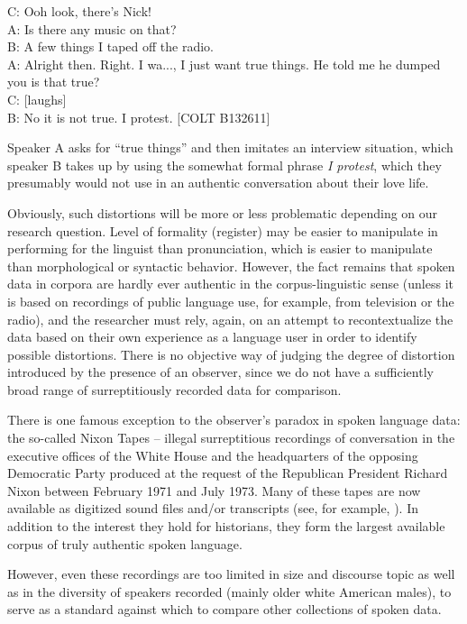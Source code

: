 \begin{exe}
\ex
\label{ex:truethings}
C: Ooh look, there's Nick! \\
A: Is there any music on that? \\
B: A few things I taped off the radio. \\
A: Alright then. Right. I wa..., I just want true things. He told me he dumped you is that true? \\
C: [laughs] \\
B: No it is not true. I protest. [COLT B132611] 
\end{exe}

Speaker A asks for ``true things'' and then imitates an interview situation, which speaker B takes up by using the somewhat formal phrase \textit{I protest}, which they presumably would not use in an authentic conversation about their love life.

Obviously, such distortions will be more or less problematic depending on our research question. Level of formality (register) may be easier to manipulate in performing for the linguist than pronunciation, which is easier to manipulate than morphological or syntactic behavior. However, the fact remains that spoken data in corpora are hardly ever authentic in the corpus-linguistic sense (unless it is based on recordings of public language use, for example, from television or the radio), and the researcher must rely, again, on an attempt to recontextualize the data based on their own experience as a language user in order to identify possible distortions. There is no objective way of judging the degree of distortion introduced by the presence of an observer, since we do not have a sufficiently broad range of surreptitiously recorded data for comparison.

There is one famous exception to the observer's paradox in spoken language data: the so-called Nixon Tapes -- illegal surreptitious recordings of conversation in the executive offices of the White House and the headquarters of the opposing Democratic Party produced at the request of the Republican President Richard Nixon between February 1971 and July 1973. Many of these tapes are now available as digitized sound files and/or transcripts (see, for example, \citealt{nichter_nixon_2007}). In addition to the interest they hold for historians, they form the largest available corpus of truly authentic spoken language.

However, even these recordings are too limited in size and discourse topic as well as in the diversity of speakers recorded (mainly older white American males), to serve as a standard against which to compare other collections of spoken data.

